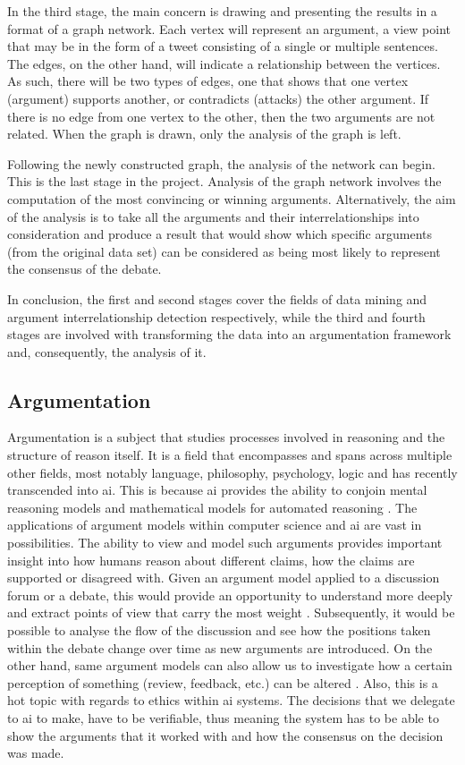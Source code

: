         In the third stage, the main concern is drawing and presenting the results in a format of a graph network. Each vertex will represent an argument, a view point that may be in the form of a tweet consisting of a single or multiple sentences. The edges, on the other hand, will indicate a relationship between the vertices. As such, there will be two types of edges, one that shows that one vertex (argument) supports another, or contradicts (attacks) the other argument. If there is no edge from one vertex to the other, then the two arguments are not related. When the graph is drawn, only the analysis of the graph is left.
     
        Following the newly constructed graph, the analysis of the network can begin. This is the last stage in the project. Analysis of the graph network involves the computation of the most convincing or winning arguments. Alternatively, the aim of the analysis is to take all the arguments and their interrelationships into consideration and produce a result that would show which specific arguments (from the original data set) can be considered as being most likely to represent the consensus of the debate.
     
        In conclusion, the first and second stages cover the fields of data mining and argument interrelationship detection respectively, while the third and fourth stages are involved with transforming the data into an argumentation framework and, consequently, the analysis of it.

    \subsection{Argumentation} \label{argumentation}
        Argumentation is a subject that studies processes involved in reasoning and the structure of reason itself. It is a field that encompasses and spans across multiple other fields, most notably language, philosophy, psychology, logic and has recently transcended into \gls{ai}. This is because \gls{ai} provides the ability to conjoin mental reasoning models and mathematical models for automated reasoning \autocite{Lippi2016ArgumentationMS}. The applications of argument models within computer science and \gls{ai} are vast in possibilities. The ability to view and model such arguments provides important insight into how humans reason about different claims, how the claims are supported or disagreed with. Given an argument model applied to a discussion forum or a debate, this would provide an opportunity to understand more deeply and extract points of view that carry the most weight \autocite{Cocarascu2017MiningBA}. Subsequently, it would be possible to analyse the flow of the discussion and see how the positions taken within the debate change over time as new arguments are introduced. On the other hand, same argument models can also allow us to investigate how a certain perception of something (review, feedback, etc.) can be altered \autocite{ApproxToTruth}. Also, this is a hot topic with regards to ethics within \gls{ai} systems. The decisions that we delegate to \gls{ai} to make, have to be verifiable, thus meaning the system has to be able to show the arguments that it worked with and how the consensus on the decision was made. 
     
